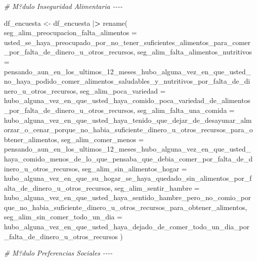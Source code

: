 \documentclass[
]{book}
\newenvironment{Shaded}{\begin{snugshade}}{\end{snugshade}}
\newcommand{\AttributeTok}[1]{\textcolor[rgb]{0.77,0.63,0.00}{#1}}
\newcommand{\CommentTok}[1]{\textcolor[rgb]{0.56,0.35,0.01}{\textit{#1}}}
\newcommand{\ErrorTok}[1]{\textcolor[rgb]{0.64,0.00,0.00}{\textbf{#1}}}
\newcommand{\FunctionTok}[1]{\textcolor[rgb]{0.00,0.00,0.00}{#1}}
\newcommand{\NormalTok}[1]{#1}
\newcommand{\OtherTok}[1]{\textcolor[rgb]{0.56,0.35,0.01}{#1}}
\newcommand{\SpecialCharTok}[1]{\textcolor[rgb]{0.00,0.00,0.00}{#1}}
\theoremstyle{definition}
\theoremstyle{definition}
\theoremstyle{definition}
\theoremstyle{definition}
\theoremstyle{remark}
\begin{document}
\begin{Shaded}
\begin{Highlighting}[]
\CommentTok{\# M?dulo Inseguridad Alimentaria {-}{-}{-}{-}}

\NormalTok{df\_encuesta }\OtherTok{\textless{}{-}}\NormalTok{ df\_encuesta }\SpecialCharTok{|}\ErrorTok{\textgreater{}}
\FunctionTok{rename}\NormalTok{(}
\AttributeTok{seg\_alim\_preocupacion\_falta\_alimentos =}\NormalTok{ usted\_se\_haya\_preocupado\_por\_no\_tener\_suficientes\_alimentos\_para\_comer\_por\_falta\_de\_dinero\_u\_otros\_recursos,}
\AttributeTok{seg\_alim\_falta\_alimentos\_nutritivos =}\NormalTok{ pensando\_aun\_en\_los\_ultimos\_12\_meses\_hubo\_alguna\_vez\_en\_que\_usted\_no\_haya\_podido\_comer\_alimentos\_saludables\_y\_nutritivos\_por\_falta\_de\_dinero\_u\_otros\_recursos,}
\AttributeTok{seg\_alim\_poca\_variedad =}\NormalTok{ hubo\_alguna\_vez\_en\_que\_usted\_haya\_comido\_poca\_variedad\_de\_alimentos\_por\_falta\_de\_dinero\_u\_otros\_recursos,}
\AttributeTok{seg\_alim\_falta\_una\_comida =}\NormalTok{ hubo\_alguna\_vez\_en\_que\_usted\_haya\_tenido\_que\_dejar\_de\_desayunar\_almorzar\_o\_cenar\_porque\_no\_habia\_suficiente\_dinero\_u\_otros\_recursos\_para\_obtener\_alimentos,}
\AttributeTok{seg\_alim\_comer\_menos =}\NormalTok{ pensando\_aun\_en\_los\_ultimos\_12\_meses\_hubo\_alguna\_vez\_en\_que\_usted\_haya\_comido\_menos\_de\_lo\_que\_pensaba\_que\_debia\_comer\_por\_falta\_de\_dinero\_u\_otros\_recursos,}
\AttributeTok{seg\_alim\_sin\_alimentos\_hogar =}\NormalTok{ hubo\_alguna\_vez\_en\_que\_su\_hogar\_se\_haya\_quedado\_sin\_alimentos\_por\_falta\_de\_dinero\_u\_otros\_recursos,}
\AttributeTok{seg\_alim\_sentir\_hambre =}\NormalTok{ hubo\_alguna\_vez\_en\_que\_usted\_haya\_sentido\_hambre\_pero\_no\_comio\_porque\_no\_habia\_suficiente\_dinero\_u\_otros\_recursos\_para\_obtener\_alimentos,}
\AttributeTok{seg\_alim\_sin\_comer\_todo\_un\_dia =}\NormalTok{ hubo\_alguna\_vez\_en\_que\_usted\_haya\_dejado\_de\_comer\_todo\_un\_dia\_por\_falta\_de\_dinero\_u\_otros\_recursos}
\NormalTok{)}
          
\CommentTok{\# M?dulo Preferencias Sociales {-}{-}{-}{-}}


\end{Highlighting}
\end{Shaded}
\end{document}
